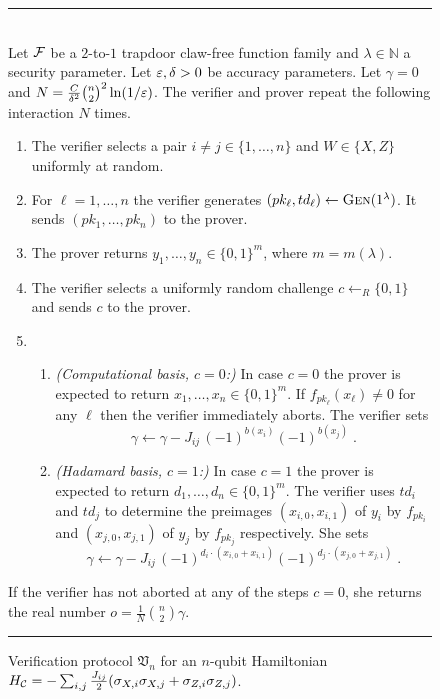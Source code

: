 \begin{figure}[htbp]
\rule[1ex]{16.5cm}{0.5pt}\\
Let $\mathcal{F}$ be a $2$-to-$1$ trapdoor claw-free function family and $\lambda\in\mathbb{N}$ a security parameter. Let $\varepsilon,\delta>0$ be accuracy parameters. Let $\gamma = 0$ and $N = \frac{C}{\delta^2}{n\choose 2}^2 \ln(1/\varepsilon)$.
The verifier and prover repeat the following interaction $N$ times.
 \begin{enumerate}
\item The verifier selects a pair $i\neq j \in \{1,\ldots,n\}$ and $W\in\{X,Z\}$ uniformly at random.
\item For $\ell=1,\ldots,n$ the verifier generates $(pk_\ell,td_\ell)\leftarrow \textsc{Gen}(1^\lambda)$. It sends $(pk_1,\ldots,pk_n)$ to the prover. 
\item The prover returns $y_1,\ldots,y_n \in \{0,1\}^m$, where $m=m(\lambda)$. 
\item The verifier selects a uniformly random challenge $c\leftarrow_R \{0,1\}$ and sends $c$ to the prover. 
\item 
\begin{enumerate}
\item \emph{(Computational basis, $c=0$:)} In case $c=0$ the prover is expected to return $x_1,\ldots,x_n\in\{0,1\}^m$. If $f_{pk_\ell}(x_\ell)\neq 0$ for any $\ell$ then the verifier immediately aborts. The verifier sets 
\[\gamma \leftarrow \gamma - J_{ij}\, (-1)^{b(x_i)}(-1)^{b(x_j)}\;.\] 
\item \emph{(Hadamard basis, $c=1$:)} In case $c=1$ the prover is expected to return $d_1,\ldots,d_n\in \{0,1\}^m$. The verifier uses $td_i$ and $td_j$ to determine the preimages $(x_{i,0},x_{i,1})$ of $y_i$ by $f_{pk_i}$ and  $(x_{j,0},x_{j,1})$ of $y_j$ by $f_{pk_j}$ respectively. She sets 
\[ \gamma \leftarrow \gamma - J_{ij}\, (-1)^{d_i\cdot( x_{i,0}+x_{i,1})} (-1)^{d_j\cdot( x_{j,0}+x_{j,1})}\;.\] 
\end{enumerate}
\end{enumerate}
If the verifier has not aborted at any of the steps $c=0$, she returns the real number $o=\frac{1}{N}{n\choose 2}\gamma$. 
\rule[1ex]{16.5cm}{0.5pt}
\caption{Verification protocol $\mathfrak{V}_n$ for an $n$-qubit Hamiltonian $H_{\mathcal{C}} = - \sum_{i,j} \frac{J_{ij}}{2}(\sigma_{X,i} \sigma_{X,j} + \sigma_{Z,i} \sigma_{Z,j})$.}
\label{fig:protocol-mahadev-nq}
\end{figure}

